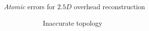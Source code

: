 \documentclass[export]{beamer}
\begin{document}
\begin{frame}[plain]{\emph{Atomic} errors for $2.5D$ overhead reconstruction}
{\begin{figure}
\begin{center}
\begin{subfigure}{.28\textwidth}
                                \caption{\label{fig::fac_height} Inaccurate topology}
                            \end{subfigure}
                            \hspace{10pt}
                            \begin{subfigure}{.28\textwidth}

\end{subfigure}
\end{center}
\end{figure}}
\end{frame}
\end{document}
